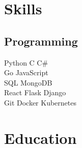 \documentclass[]{latex/resume}
\begin{document}
\begin{minipage}[t]{0.75\textwidth}
    \sectionsep




%
%   

\end{minipage} 
\hfill
\begin{minipage}[t]{0.25\textwidth} 


\section{Skills}
    \subsection{Programming}
                Python \textbullet{}
                C \textbullet{}
                C\#
                \\
                Go \textbullet{}
                JavaScript
                \\
        \sectionsep
                SQL \textbullet{}
                MongoDB
                \\
        \sectionsep
                React \textbullet{}
                Flask \textbullet{}
                Django 
                \\
        \sectionsep
                Git  \textbullet{}
                Docker \textbullet{}
                Kubernetes
                \\
\sectionsep


\section{Education} 

\end{minipage}
\end{document}
